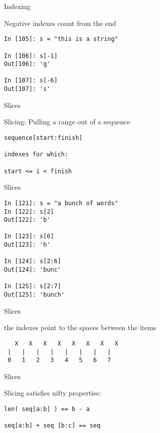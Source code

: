 \documentclass{beamer}
\begin{document}
\begin{frame}[fragile]{Indexing}

{\Large Negative indexes count from the end}

\vfill
\begin{verbatim}
In [105]: s = "this is a string"

In [106]: s[-1]
Out[106]: 'g'

In [107]: s[-6]
Out[107]: 's'
\end{verbatim}

\end{frame}

\begin{frame}[fragile]{Slices}

{\Large Slicing: Pulling a range out of a sequence}

\begin{verbatim}
sequence[start:finish]  

indexes for which:

start <= i < finish
\end{verbatim}

\end{frame}

\begin{frame}[fragile]{Slices}
\begin{verbatim}
In [121]: s = "a bunch of words"
In [122]: s[2]
Out[122]: 'b'

In [123]: s[6]
Out[123]: 'h'

In [124]: s[2:6]
Out[124]: 'bunc'

In [125]: s[2:7]
Out[125]: 'bunch'
\end{verbatim}

\end{frame}


\begin{frame}[fragile]{Slices}

{\Large the indexes point to the spaces between the items}

\vfill
\begin{verbatim}
   X   X   X   X   X   X   X   X
 |   |   |   |   |   |   |   | 
 0   1   2   3   4   5   6   7
\end{verbatim}

\end{frame}

\begin{frame}[fragile]{Slices}

{\Large Slicing satisfies nifty properties:

\vfill
\begin{verbatim}
len( seq[a:b] ) == b - a

seq[a:b] + seq [b:c] == seq

\end{verbatim}

}

\end{frame}
\end{document}
